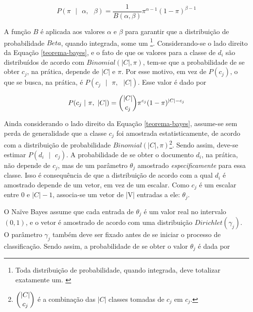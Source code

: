 \begin{equation}
\label{beta}
\ensuremath{P(\pi\mbox{ }|\mbox{ } \alpha,\mbox{ }\beta) = \frac{1}{B(\alpha, \beta)}\pi^{\alpha - 1}(1 - \pi)^{\beta - 1}}
\end{equation}

A função \ensuremath{B} é aplicada aos valores \ensuremath{\alpha} e \ensuremath{\beta} para garantir que a distribuição de probabilidade \ensuremath{Beta}, quando integrada, some um \cite{stat-distribs}\footnote{Toda distribuição de probabilidade, quando integrada, deve totalizar exatamente um. \cite{stat-distribs}}. Considerando-se o lado direito da Equação \ref{teorema-bayes}, e o fato de que os valores para a classe de \ensuremath{d_i} são distribuídos de acordo com \ensuremath{Binomial(|C|, \pi)}, tem-se que a probabilidade de se obter \ensuremath{c_j}, na prática, depende de \ensuremath{|C|} e \ensuremath{\pi}. Por esse motivo, em vez de \ensuremath{P(c_j)}, o que se busca, na prática, é \ensuremath{P(c_j\mbox{ } |\mbox{ } \pi,\mbox{ } |C|)}. Esse valor é dado por %

\begin{equation}
\label{binomial}
\ensuremath{P(c_j\mbox{ } |\mbox{ } \pi,\mbox{ } |C|) =  \dbinom{|C|}{c_j}\pi^{c_j}(1 - \pi)^{|C| - c_j}}
\end{equation}


Ainda considerando o lado direito da Equação \ref{teorema-bayes}, assume-se sem perda de generalidade que a classe \ensuremath{c_j} foi amostrada estatisticamente, de acordo com a distribuição de probabilidade \ensuremath{Binomial(|C|, \pi)}\footnote{\ensuremath{\dbinom{|C|}{c_j}} é a combinação das \ensuremath{|C|} classes tomadas de \ensuremath{c_j} em \ensuremath{c_j}.}. Sendo assim, deve-se estimar \ensuremath{P(d_i\mbox{ } |\mbox{ }c_j)}. A probabilidade de se obter o documento \ensuremath{d_i}, na prática, não depende de \ensuremath{c_j}, mas de um parâmetro \ensuremath{\theta_j} amostrado \emph{especificamente} para essa classe. Isso é consequência de que a distribuição de acordo com a qual \ensuremath{d_i} é amostrado depende de um vetor, em vez de um escalar. Como \ensuremath{c_j} é um escalar entre \ensuremath{0} e \ensuremath{|C| - 1}, associa-se um vetor de |V| entradas a ele: \ensuremath{\theta_j}.


O Naïve Bayes assume que cada entrada de \ensuremath{\theta_j} é um valor real no intervalo \ensuremath{(0,1)}, e o vetor é amostrado de acordo com uma distribuição \ensuremath{Dirichlet(\gamma_j)}. O parâmetro \ensuremath{\gamma_j} também deve ser fixado antes de se iniciar o processo de classificação. Sendo assim, a probabilidade de se obter o valor \ensuremath{\theta_j} é dada por %

